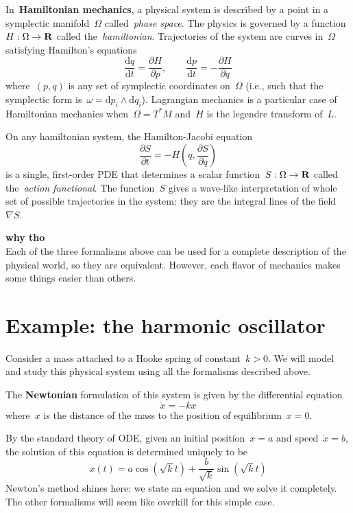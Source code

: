 In~{\bf Hamiltonian mechanics}, a physical system is described by a point in
a symplectic manifold~$\Omega$ called~\emph{phase space}.  The physics is
governed by a function~$H:\Omega\to\mathbf{R}$ called the~\emph{hamiltonian}.
Trajectories of the system are curves in~$\Omega$ satisfying Hamilton's
equations
\[
	\frac{\mathrm{d}q}{\mathrm{d}t}=\frac{\partial H}{\partial p},
	\qquad
	\frac{\mathrm{d}p}{\mathrm{d}t}=-\frac{\partial H}{\partial q}
\]
where~$(p,q)$ is any set of symplectic coordinates on~$\Omega$ (i.e., such
that the symplectic form is~$\omega=\mathrm{d}p_i\wedge\mathrm{d}q_i$).
Lagrangian mechanics is a particular case of Hamiltonian mechanics
when~$\Omega=T^*M$ and~$H$ is the legendre transform of~$L$.

On any hamiltonian system, the Hamilton-Jacobi equation
\[
	\frac{\partial S}{\partial t}
	=
	-H\left(q, \frac{\partial S}{\partial q}\right)
\]
is a single, first-order PDE that determines a scalar
function~$S:\Omega\to\mathbf{R}$ called the~\emph{action functional}.  The
function~$S$ gives a wave-like interpretation of whole set of possible
trajectories in the system: they are the integral lines of the field~$\nabla
S$.



{\bf why tho}\\
Each of the three formalisms above can be used for a complete description of
the physical world, so they are equivalent.  However, each flavor of
mechanics makes some things easier than others.

\section{Example: the harmonic oscillator}

Consider a mass attached to a Hooke spring of constant~$k>0$.
We will model and study this physical system using all the formalisms
described above.

The {\bf Newtonian} formulation of this system is given by the differential
equation
\[
	\ddot x = -kx
\]
where~$x$ is the distance of the mass to the position of equilibrium~$x=0$.

By the standard theory of ODE, given an initial position~$x=a$ and
speed~$\dot x = b$, the solution of this equation is determined uniquely to
be
\[
	x(t) =
	a\cos\left(\sqrt kt\right)
	+\frac{b}{\sqrt k}\sin\left(\sqrt{k} t\right)
\]
Newton's method shines here: we state an equation and we solve it completely.
The other formalisms will seem like overkill for this simple case.

